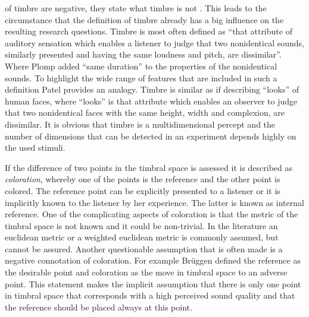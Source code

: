  of timbre are negative, they state what timbre is not
. This leads to the circumstance that the definition of timbre already has
a big influence on the resulting research questions.  Timbre is most often
defined as ``that attribute of auditory sensation which enables a listener to
judge that two nonidentical sounds, similarly presented and having the same
loudness and pitch, are dissimilar''.\autocite{ANSI1994} Where Plomp added
``same duration'' to the properties of the nonidentical
sounds.\autocite[][p.\,285]{Moore2012a} To highlight the wide range of features
that are included in such a definition Patel\autocite{Patel2010} provides an
analogy. Timbre is similar as if describing ``looks'' of
human faces, where ``looks'' is that attribute which enables an observer to judge
that two nonidentical faces with the same height, width and complexion, are
dissimilar.  It is obvious that timbre is a multidimensional percept
and the number of dimensions that can be detected in an experiment depends highly
on the used stimuli.

If the difference of two points in the timbral space is assessed it is
described as \emph{coloration}, whereby one of the points is the reference and
the other point is colored. The reference point can be explicitly presented to a
listener or it is implicitly known to the listener by her experience. The latter
is known as internal reference.
One of the complicating aspects of coloration is that the metric of the
timbral space is not known and it could be non-trivial. In the literature
an euclidean metric\autocite[See for example][]{Plomp1967} or a weighted euclidean
metric\autocite[An example and discussion of different metrices is presented in][]{McAdams1995}
is commonly assumed, but cannot be assured.
Another questionable assumption that is often made is a negative connotation
of coloration. For example Brüggen\autocite[][p.\,8; note that on p.\,13 he
relativates his opinion by stating that for performances such as music played in a
concert hall the coloration due to the room is a desired one and the perceived
quality of the sound is  better for the colored case]{Bruggen2001}
defined the reference
as the desirable point and coloration as the move in timbral space to an adverse
point. This statement makes the implicit assumption that there is only one point in
timbral space that corresponds with a high perceived sound quality and that the
reference should be placed always at this point.

